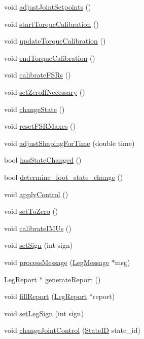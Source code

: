 \begin{DoxyCompactItemize}
\item 
void \hyperlink{classLeg_a2a1b6b4345de1e518900e5d0fbeee49c}{adjust\+Joint\+Setpoints} ()
\item 
void \hyperlink{classLeg_a2e57891c74878490c6fae9e3a726475a}{start\+Torque\+Calibration} ()
\item 
void \hyperlink{classLeg_a02e7dfa847455404aa9e855b2e65d965}{update\+Torque\+Calibration} ()
\item 
void \hyperlink{classLeg_a35242d38ec77ff962dee1d41c0b0bb25}{end\+Torque\+Calibration} ()
\item 
void \hyperlink{classLeg_a6397dd7adda69b882dc8896befe44521}{calibrate\+F\+S\+Rs} ()
\item 
void \hyperlink{classLeg_a090059ad6eb80a0bab1959e11204a9fc}{set\+Zero\+If\+Necessary} ()
\item 
void \hyperlink{classLeg_aa94863075e3315241dd38295f17b367a}{change\+State} ()
\item 
void \hyperlink{classLeg_a3c17ee6284bad7ffd7ed70ca489be71d}{reset\+F\+S\+R\+Maxes} ()
\item 
void \hyperlink{classLeg_a15b64f84ff059dcc5c0e1737713065ef}{adjust\+Shaping\+For\+Time} (double time)
\item 
bool \hyperlink{classLeg_ae45181c3f1985d1dd3beaa0a8fdaeb80}{has\+State\+Changed} ()
\item 
bool \hyperlink{classLeg_a62516955ed494320f201004efe1db22c}{determine\+\_\+foot\+\_\+state\+\_\+change} ()
\item 
void \hyperlink{classLeg_a3f3fee107dde490eba904090ec1c5432}{apply\+Control} ()
\item 
void \hyperlink{classLeg_a213af951e26c6c4f5c4fc68d3d4023db}{set\+To\+Zero} ()
\item 
void \hyperlink{classLeg_a233cc08e57814cd1ce2ed919fb07a97c}{calibrate\+I\+M\+Us} ()
\item 
void \hyperlink{classLeg_a72cdf72c2b9ea17abfa76803fccad197}{set\+Sign} (int sign)
\item 
void \hyperlink{classLeg_a3b1fac088cad54b09b479350df64c4bc}{process\+Message} (\hyperlink{classLegMessage}{Leg\+Message} $\ast$msg)
\item 
\hyperlink{classLegReport}{Leg\+Report} $\ast$ \hyperlink{classLeg_aa32dd6354841f77f6957a366a66732a9}{generate\+Report} ()
\item 
void \hyperlink{classLeg_afea7c9698b1380dc95cd4d691985a216}{fill\+Report} (\hyperlink{classLegReport}{Leg\+Report} $\ast$report)
\item 
void \hyperlink{classLeg_ac896449b8a94aaa1bc2e7695e27646eb}{set\+Leg\+Sign} (int sign)
\item 
void \hyperlink{classLeg_a37cda412d2d7e8469847ad0c3180de03}{change\+Joint\+Control} (\hyperlink{States_8hpp_a26aafbeccd8f356b39e1809f1ab9cfdc}{State\+ID} state\+\_\+id)
\end{DoxyCompactItemize}


